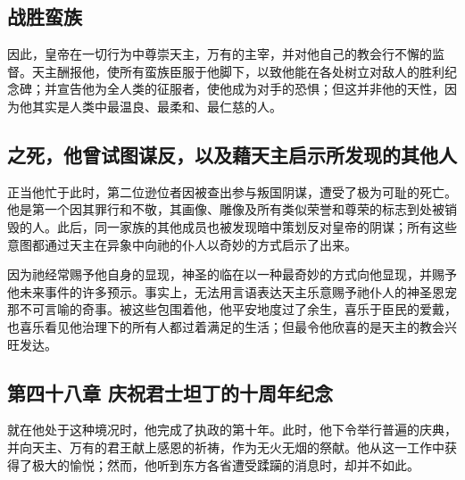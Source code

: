 
\subsection{战胜蛮族}

因此，皇帝在一切行为中尊崇天主，万有的主宰，并对他自己的教会行不懈的监督。天主酬报他，使所有蛮族臣服于他脚下，以致他能在各处树立对敌人的胜利纪念碑；并宣告他为全人类的征服者，使他成为对手的恐惧；但这并非他的天性，因为他其实是人类中最温良、最柔和、最仁慈的人。\par


\subsection{之死，他曾试图谋反，以及藉天主启示所发现的其他人}

正当他忙于此时，第二位逊位者因被查出参与叛国阴谋，遭受了极为可耻的死亡。他是第一个因其罪行和不敬，其画像、雕像及所有类似荣誉和尊荣的标志到处被销毁的人。此后，同一家族的其他成员也被发现暗中策划反对皇帝的阴谋；所有这些意图都通过天主在异象中向祂的仆人以奇妙的方式启示了出来。\par

因为祂经常赐予他自身的显现，神圣的临在以一种最奇妙的方式向他显现，并赐予他未来事件的许多预示。事实上，无法用言语表达天主乐意赐予祂仆人的神圣恩宠那不可言喻的奇事。被这些包围着他，他平安地度过了余生，喜乐于臣民的爱戴，也喜乐看见他治理下的所有人都过着满足的生活；但最令他欣喜的是天主的教会兴旺发达。\par


\subsection{第四十八章 庆祝君士坦丁的十周年纪念}

就在他处于这种境况时，他完成了执政的第十年。此时，他下令举行普遍的庆典，并向天主、万有的君王献上感恩的祈祷，作为无火无烟的祭献。他从这一工作中获得了极大的愉悦；然而，他听到东方各省遭受蹂躏的消息时，却并不如此。\par



